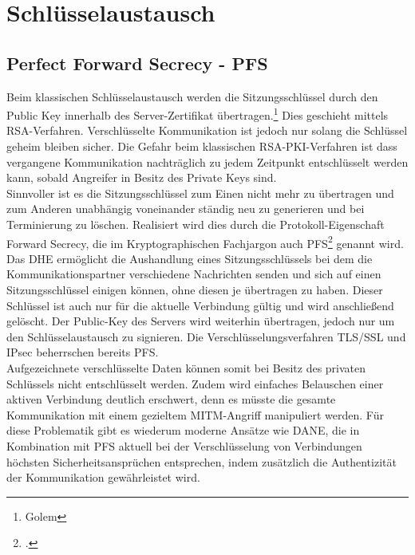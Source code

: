 \chapter{Schlüsselaustausch}
\section{Perfect Forward Secrecy - PFS}
Beim klassischen Schlüsselaustausch werden die Sitzungsschlüssel durch den Public Key innerhalb des Server-Zertifikat übertragen.\footnote{Golem} Dies geschieht mittels \ac{RSA}-Verfahren. Verschlüsselte Kommunikation ist jedoch nur solang die Schlüssel geheim bleiben sicher. Die Gefahr beim klassischen \ac{RSA}-\ac{PKI}-Verfahren ist dass vergangene Kommunikation nachträglich zu jedem Zeitpunkt entschlüsselt werden kann, sobald Angreifer in Besitz des Private Keys sind.\medskip\\
Sinnvoller ist es die Sitzungsschlüssel %
zum Einen nicht mehr zu übertragen und zum Anderen unabhängig voneinander ständig neu zu generieren und bei Terminierung zu löschen. Realisiert wird dies durch die Protokoll-Eigenschaft Forward Secrecy, die im Kryptographischen Fachjargon auch \ac{PFS}\footcite{Boeck2013} genannt wird. \medskip\\
Das \ac{DHE} ermöglicht die Aushandlung eines Sitzungsschlüssels bei dem die Kommunikationspartner verschiedene Nachrichten senden und sich auf einen Sitzungsschlüssel einigen können, ohne diesen je übertragen zu haben. Dieser Schlüssel ist auch nur für die aktuelle Verbindung gültig und wird anschließend gelöscht. Der Public-Key des Servers wird weiterhin übertragen, jedoch nur um den Schlüsselaustausch zu signieren. Die Verschlüsselungsverfahren \ac{TLS/SSL} und IPsec beherrschen bereits \ac{PFS}.\medskip\\
Aufgezeichnete verschlüsselte Daten können somit bei Besitz des privaten Schlüssels nicht entschlüsselt werden. Zudem wird einfaches Belauschen einer aktiven Verbindung deutlich erschwert, denn es müsste die gesamte Kommunikation mit einem gezieltem \ac{MITM}-Angriff manipuliert werden. Für diese Problematik gibt es wiederum moderne Ansätze wie \ac{DANE}, die in Kombination mit \ac{PFS} aktuell bei der Verschlüsselung von Verbindungen höchsten Sicherheitsansprüchen entsprechen, indem zusätzlich die Authentizität der Kommunikation gewährleistet wird.\medskip\\ %
